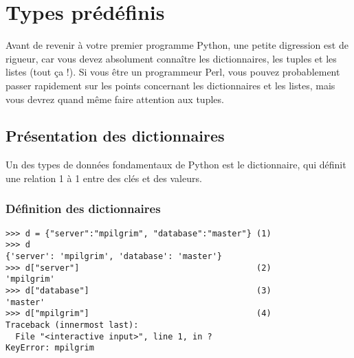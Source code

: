 \chapter{Types prédéfinis}\label{Types prédéfinis}

Avant de revenir à votre premier programme Python, une petite digression est de rigueur, car vous devez absolument connaître les dictionnaires, les tuples et les listes (tout ça !). Si vous être un programmeur Perl, vous pouvez probablement passer rapidement sur les points concernant les dictionnaires et les listes, mais vous devrez quand même faire attention aux tuples.

\section{Présentation des dictionnaires}\label{Présentation des dictionnaires}

Un des types de données fondamentaux de Python est le dictionnaire, qui définit une relation 1 à 1 entre des clés et des valeurs.




\subsection{Définition des dictionnaires}

\begin{example}
\begin{lstlisting}
>>> d = {"server":"mpilgrim", "database":"master"} (1)
>>> d
{'server': 'mpilgrim', 'database': 'master'}
>>> d["server"]                                    (2)
'mpilgrim'
>>> d["database"]                                  (3)
'master'
>>> d["mpilgrim"]                                  (4)
Traceback (innermost last):
  File "<interactive input>", line 1, in ?
KeyError: mpilgrim
\end{lstlisting}
\end{example}


